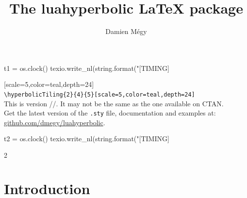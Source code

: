 \documentclass{article}
\title{The \textbf{\textsf{luahyperbolic}} LaTeX package}
\author{Damien Mégy}
\date{}
\begin{document}
\maketitle
\begin{luacode*}
t1 = os.clock()
texio.write_nl(string.format("[TIMING] %
\end{luacode*}
\begin{center}
[scale=5,color=teal,depth=24]\\
\verb+\hyperbolicTiling{2}{4}{5}[scale=5,color=teal,depth=24]+ \\
This is version \the\year/\the\month/\the\day. It may not be the same as the one available on CTAN.\\
Get the latest version of the \verb+.sty+ file, documentation and examples at:
\href{https://github.com/dmegy/luahyperbolic}{github.com/dmegy/luahyperbolic}.
\end{center}

\begin{luacode*}
t2 = os.clock()
texio.write_nl(string.format("[TIMING] %
\end{luacode*}
\vspace{1cm}



\begin{multicols}{2}
\setcounter{tocdepth}{2}
\tableofcontents
\end{multicols}



\newpage
\section{Introduction}
\end{document}
